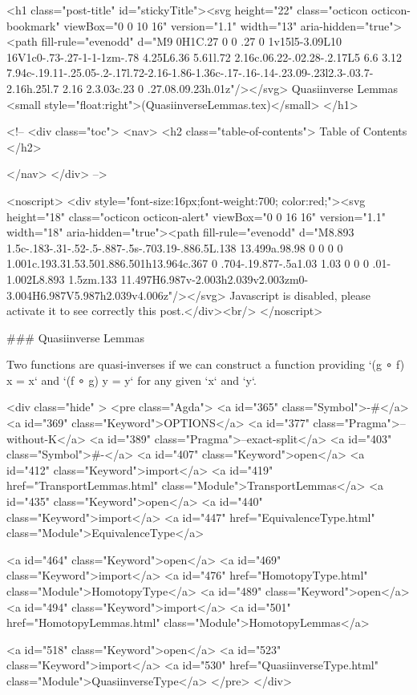   <h1 class="post-title" id="stickyTitle"><svg height="22" class="octicon octicon-bookmark" viewBox="0 0 10 16" version="1.1" width="13" aria-hidden="true"><path fill-rule="evenodd" d="M9 0H1C.27 0 0 .27 0 1v15l5-3.09L10 16V1c0-.73-.27-1-1-1zm-.78 4.25L6.36 5.61l.72 2.16c.06.22-.02.28-.2.17L5 6.6 3.12 7.94c-.19.11-.25.05-.2-.17l.72-2.16-1.86-1.36c-.17-.16-.14-.23.09-.23l2.3-.03.7-2.16h.25l.7 2.16 2.3.03c.23 0 .27.08.09.23h.01z"/></svg> Quasiinverse Lemmas <small style="float:right">(QuasiinverseLemmas.tex)</small>
  </h1>

  <!-- 
  <div class="toc">
    <nav>
    <h2 class="table-of-contents"> Table of Contents </h2>
      

    </nav>
  </div>
   -->

  <noscript>
  <div style="font-size:16px;font-weight:700; color:red;"><svg height="18" class="octicon octicon-alert" viewBox="0 0 16 16" version="1.1" width="18" aria-hidden="true"><path fill-rule="evenodd" d="M8.893 1.5c-.183-.31-.52-.5-.887-.5s-.703.19-.886.5L.138 13.499a.98.98 0 0 0 0 1.001c.193.31.53.501.886.501h13.964c.367 0 .704-.19.877-.5a1.03 1.03 0 0 0 .01-1.002L8.893 1.5zm.133 11.497H6.987v-2.003h2.039v2.003zm0-3.004H6.987V5.987h2.039v4.006z"/></svg> Javascript is disabled, please activate it to see correctly this post.</div><br/>
  </noscript>

  ### Quasiinverse Lemmas

Two functions are quasi-inverses if we can construct a function providing
`(g ∘ f) x = x` and `(f ∘ g) y = y` for any given `x` and `y`.

<div class="hide" >
<pre class="Agda">
<a id="365" class="Symbol">{-#</a> <a id="369" class="Keyword">OPTIONS</a> <a id="377" class="Pragma">--without-K</a> <a id="389" class="Pragma">--exact-split</a> <a id="403" class="Symbol">#-}</a>
<a id="407" class="Keyword">open</a> <a id="412" class="Keyword">import</a> <a id="419" href="TransportLemmas.html" class="Module">TransportLemmas</a>
<a id="435" class="Keyword">open</a> <a id="440" class="Keyword">import</a> <a id="447" href="EquivalenceType.html" class="Module">EquivalenceType</a>

<a id="464" class="Keyword">open</a> <a id="469" class="Keyword">import</a> <a id="476" href="HomotopyType.html" class="Module">HomotopyType</a>
<a id="489" class="Keyword">open</a> <a id="494" class="Keyword">import</a> <a id="501" href="HomotopyLemmas.html" class="Module">HomotopyLemmas</a>


<a id="518" class="Keyword">open</a> <a id="523" class="Keyword">import</a> <a id="530" href="QuasiinverseType.html" class="Module">QuasiinverseType</a>
</pre>
</div>


